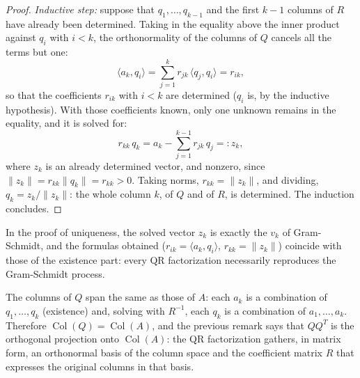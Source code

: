 \documentclass[11pt, a4paper]{article}
\begin{document}
\begin{proof}
\textit{Inductive step:} suppose that $q_1, \dots, q_{k-1}$ and the first $k-1$ columns of $R$ have already been determined. Taking in the equality above the inner product against $q_i$ with $i < k$, the orthonormality of the columns of $Q$ cancels all the terms but one:
\[
\langle a_k, q_i \rangle = \sum_{j=1}^{k} r_{jk} \, \langle q_j, q_i \rangle = r_{ik},
\]
so that the coefficients $r_{ik}$ with $i < k$ are determined ($q_i$ is, by the inductive hypothesis). With those coefficients known, only one unknown remains in the equality, and it is solved for:
\[
r_{kk} \, q_k = a_k - \sum_{j=1}^{k-1} r_{jk} \, q_j =: z_k,
\]
where $z_k$ is an already determined vector, and nonzero, since $\|z_k\| = r_{kk} \|q_k\| = r_{kk} > 0$. Taking norms, $r_{kk} = \|z_k\|$, and dividing, $q_k = z_k / \|z_k\|$: the whole column $k$, of $Q$ and of $R$, is determined. The induction concludes.
\end{proof}

\obs In the proof of uniqueness, the solved vector $z_k$ is exactly the $v_k$ of Gram-Schmidt, and the formulas obtained ($r_{ik} = \langle a_k, q_i \rangle$, $r_{kk} = \|z_k\|$) coincide with those of the existence part: every QR factorization necessarily reproduces the Gram-Schmidt process.

\obs The columns of $Q$ span the same as those of $A$: each $a_k$ is a combination of $q_1, \dots, q_k$ (existence) and, solving with $R^{-1}$, each $q_k$ is a combination of $a_1, \dots, a_k$. Therefore $\operatorname{Col}(Q) = \operatorname{Col}(A)$, and the previous remark says that $Q Q^T$ is the orthogonal projection onto $\operatorname{Col}(A)$: the QR factorization gathers, in matrix form, an orthonormal basis of the column space and the coefficient matrix $R$ that expresses the original columns in that basis.
\end{document}

